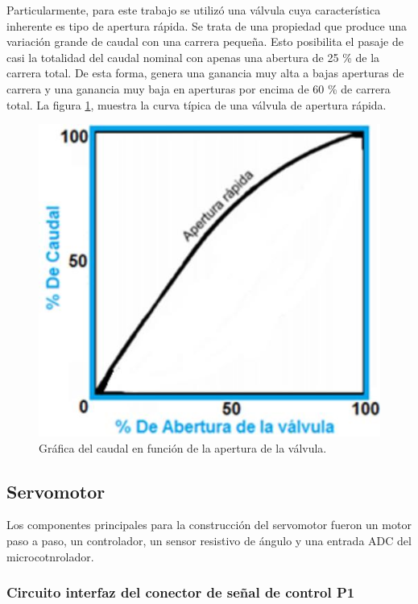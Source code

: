 Particularmente, para este trabajo se utilizó una válvula cuya característica inherente es tipo de apertura rápida. Se trata de una propiedad que produce una variación grande de caudal con una carrera pequeña. Esto posibilita el pasaje de casi la totalidad del caudal nominal con apenas una abertura de 25 \% de la carrera total.
De esta forma, genera una ganancia muy alta a bajas aperturas de carrera y una ganancia muy baja en aperturas por encima de 60 \% de carrera total. 
La figura \ref{fig:grafica caudal vs. apertura de valvula}, muestra la curva típica de una válvula de apertura rápida.
\begin{figure}[h]
\centering
\includegraphics[scale=.60]{./Figures/funcion-valvula.jpeg}
\caption{Gráfica del caudal en función de la apertura de la válvula.}
\label{fig:grafica caudal vs. apertura de valvula}
\end{figure}

\vspace{2cm}
\subsection{Servomotor}
\label{subsec:Servomotor}

Los componentes principales para la construcción del servomotor fueron un motor paso a paso, un controlador, un sensor resistivo de ángulo y una entrada ADC del microcotnrolador.


\subsubsection{Circuito interfaz del conector de señal de control P1}

